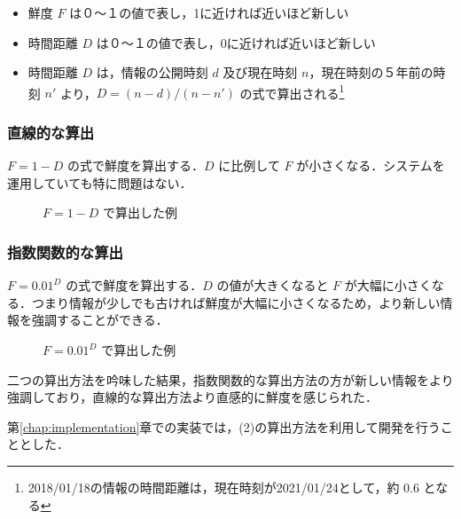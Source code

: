 \begin{itemize}
  \item 鮮度 $F$ は０～１の値で表し，1に近ければ近いほど新しい
  \item 時間距離 $D$ は０～１の値で表し，0に近ければ近いほど新しい
  \item 時間距離 $D$ は，情報の公開時刻 $d$ 及び現在時刻 $n$，現在時刻の５年前の時刻 $n'$ より，$ D =  (n - d) / (n - n') $ の式で算出される\footnote{2018/01/18の情報の時間距離は，現在時刻が2021/01/24として，約 0.6 となる}
\end{itemize}

\subsubsection{直線的な算出}

$ F = 1 - D $ の式で鮮度を算出する．$D$ に比例して $F$ が小さくなる．システムを運用していても特に問題はない．

\begin{figure}[htbp]
  \begin{center}
  \end{center}
  \caption{$ F = 1 - D $ で算出した例}
\end{figure}

\subsubsection{指数関数的な算出}

$ F =  0.01 ^ D $ の式で鮮度を算出する．$D$ の値が大きくなると $F$ が大幅に小さくなる．つまり情報が少しでも古ければ鮮度が大幅に小さくなるため，より新しい情報を強調することができる．

\begin{figure}[htbp]
  \begin{center}
  \end{center}
  \caption{$ F =  0.01 ^ D $ で算出した例}
\end{figure}

二つの算出方法を吟味した結果，指数関数的な算出方法の方が新しい情報をより強調しており，直線的な算出方法より直感的に鮮度を感じられた．

第\ref{chap:implementation}章での実装では，(2)の算出方法を利用して開発を行うこととした．
